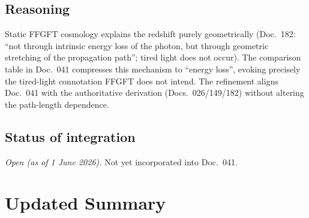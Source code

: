 \subsection*{Reasoning}

Static FFGFT cosmology explains the redshift purely geometrically
(Doc.~182: \enquote{not through intrinsic energy loss of the photon, but
through geometric stretching of the propagation path}; tired light does not
occur). The comparison table in Doc.~041 compresses this mechanism to
\enquote{energy loss}, evoking precisely the tired-light connotation FFGFT
does not intend. The refinement aligns Doc.~041 with the authoritative
derivation (Docs.~026/149/182) without altering the path-length dependence.

\subsection*{Status of integration}

\emph{Open (as of 1 June 2026).} Not yet incorporated into Doc.~041.

\section*{Updated Summary}

